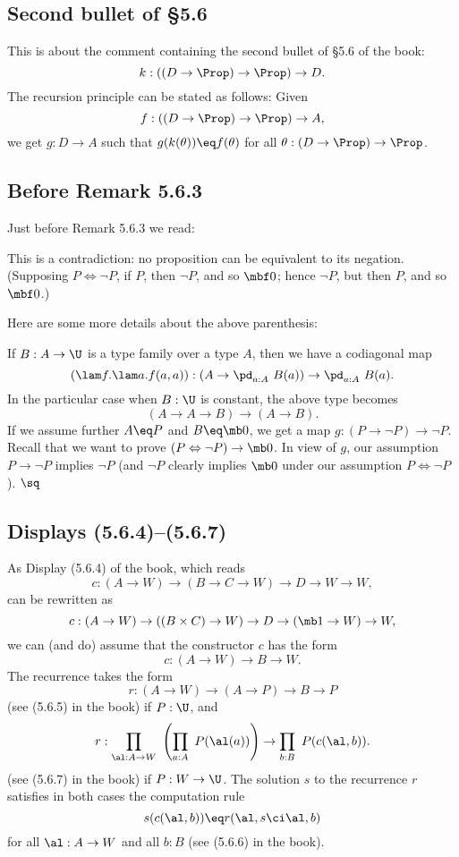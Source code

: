 \documentclass[12pt]{article}
\begin{document}

\subsection{Second bullet of \S5.6}%

This is about the comment containing the second bullet of \S5.6 of the book:
$$
k:((D\to\Prop)\to\Prop)\to D.
$$ 
The recursion principle can be stated as follows: Given 
$$
f:((D\to\Prop)\to\Prop)\to A,
$$ 
we get $g:D\to A$ such that $g(k(\theta))\eq f(\theta)$ for all $\theta:(D\to\Prop)\to\Prop$.


\subsection{Before Remark 5.6.3}%

Just before Remark 5.6.3 we read:

\nn\guillemotleft This is a contradiction: no proposition can be equivalent to its negation. (Supposing $P\Leftrightarrow\neg P$, if $P$, then $\neg P$, and so $\mbf0$; hence $\neg P$, but then $P$, and so $\mbf0$.)\guillemotright

Here are some more details about the above parenthesis:

If $B:A\to\U$ is a type family over a type $A$, then we have a codiagonal map 
\begin{equation}\label{563}
(\lam f.\lam a.f(a,a)):\left(A\to\pd_{a:A}\ B(a)\right)\to\pd_{a:A}\ B(a).
\end{equation} 
In the particular case when $B:\U$ is constant, the above type becomes 
$$
(A\to A\to B)\to(A\to B).
$$ 
If we assume further $A\eq P$ and $B\eq\mb0$, we get a map $g:(P\to\neg P)\to\neg P$. Recall that we want to prove $(P\Leftrightarrow\neg P)\to\mb0$. In view of $g$, our assumption $P\to\neg P$ implies $\neg P$ (and $\neg P$ clearly implies $\mb0$ under our assumption $P\Leftrightarrow\neg P$). $\sq$


\subsection{Displays (5.6.4)--(5.6.7)}%

As Display (5.6.4) of the book, which reads 
$$
c:(A\to W)\to(B\to C\to W)\to D\to W\to W,
$$ 
can be rewritten as 
$$
c:(A\to W)\to((B\times C)\to W)\to D\to(\mb1\to W)\to W,
$$ 
we can (and do) assume that the constructor $c$ has the form 
$$
c:(A\to W)\to B\to W.
$$ 
The recurrence takes the form 
$$
r:(A\to W)\to(A\to P)\to B\to P
$$ 
(see (5.6.5) in the book) if $P:\U$, and 
$$
r:\prod_{\al:A\to W}\ \left(\prod_{a:A}\ P(\al(a))\right)\to\prod_{b:B}\ P(c(\al,b)).
$$ 
(see (5.6.7) in the book) if $P:W\to\U$. The solution $s$ to the recurrence $r$ satisfies in both cases the computation rule
$$
s(c(\al,b))\eq r(\al,s\ci\al,b)
$$ 
for all $\al:A\to W$ and all $b:B$ (see (5.6.6) in the book).
\end{document}
